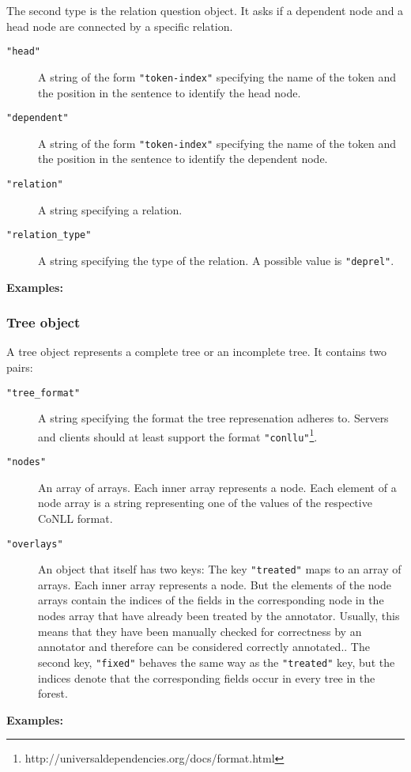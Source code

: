 \documentclass{scrartcl}
\newcommand{\jsstring}[1]{\texttt{\color{OrangeRed}"#1"}}
\newcommand{\Examples}{\noindent\textbf{Examples:}}
\begin{document}
The second type is the relation question object.
It asks if a dependent node and a head node are connected by a specific relation.
\begin{description}
    \item[\jsstring{head}] A string of the form \jsstring{token-index} specifying the name of the token and the position in the sentence to identify the head node.
    \item[\jsstring{dependent}] A string of the form \jsstring{token-index} specifying the name of the token and the position in the sentence to identify the dependent node.
    \item[\jsstring{relation}] A string specifying a relation.
    \item[\jsstring{relation\_type}] A string specifying the type of the relation.
        A possible value is \jsstring{deprel}.
\end{description}

\Examples





\subsubsection{Tree object}
\label{ssub:Tree object}

A tree object represents a complete tree or an incomplete tree.
It contains two pairs:
\begin{description}
    \item[\jsstring{tree\_format}] A string specifying the format the tree represenation adheres to.
        Servers and clients should at least support the format \jsstring{conllu}\footnote{http://universaldependencies.org/docs/format.html}.
    \item[\jsstring{nodes}] An array of arrays.
        Each inner array represents a node.
        Each element of a node array is a string representing one of the values of the respective CoNLL format.
    \item[\jsstring{overlays}] An object that itself has two keys:
        The key \jsstring{treated} maps to an array of arrays.
        Each inner array represents a node.
        But the elements of the node arrays contain the indices of the fields in the corresponding node in the nodes array that have already been treated by the annotator.
        Usually, this means that they have been manually checked for correctness by an annotator and therefore can be considered correctly annotated..
        The second key, \jsstring{fixed} behaves the same way as the \jsstring{treated} key, but the indices denote that the corresponding fields occur in every tree in the forest.
\end{description}

\Examples


\end{document}
